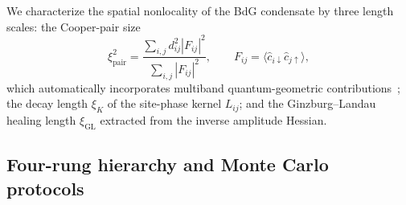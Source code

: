 \documentclass[aps,prb,twocolumn,superscriptaddress,floatfix]{revtex4-2}
\begin{document}
We characterize the spatial nonlocality of the BdG condensate by three length scales: the Cooper-pair size
\begin{equation}
\xi_{\mathrm{pair}}^2 = \frac{\sum_{i,j} d_{ij}^2 |F_{ij}|^2}{\sum_{i,j} |F_{ij}|^2}, \qquad F_{ij} = \langle \hat{c}_{i\downarrow}\hat{c}_{j\uparrow}\rangle,
\label{eq:xi_pair}
\end{equation}
which automatically incorporates multiband quantum-geometric contributions~\cite{PT15,CHK23,HUW23,Isk24}; the decay length $\xi_K$ of the site-phase kernel $L_{ij}$; and the Ginzburg--Landau healing length $\xi_{\mathrm{GL}}$ extracted from the inverse amplitude Hessian.

\subsection{Four-rung hierarchy and Monte Carlo protocols}
\end{document}
